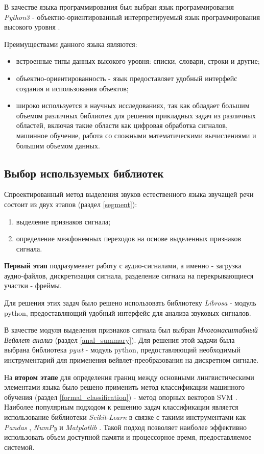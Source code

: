 \documentclass[utf8x, 14pt, oneside, a4paper]{article}
\begin{document}
	В качестве языка программирования был выбран язык программирования \textit{Python3} - объектно-ориентированный интерпретируемый язык программирования высокого уровня \cite{python}.
	
	Преимуществами данного языка являются:
	
	\begin{itemize}
		\item встроенные типы данных высокого уровня: списки, словари, строки и другие;
		\item объектно-ориентированность - язык предоставляет удобный интерфейс создания и использования объектов;
		\item широко используется в научных исследованиях, так как обладает большим объемом различных библиотек для решения прикладных задач из различных областей, включая такие области как цифровая обработка сигналов, машинное обучение, работа со сложными математическими вычислениями и большим объемом данных.
	\end{itemize}
	
	\subsection{Выбор используемых библиотек}
	
	Спроектированный метод выделения звуков естественного языка звучащей речи состоит из двух этапов (раздел \ref{segment}):
	\begin{enumerate}
		\item выделение признаков сигнала;
		\item определение межфонемных переходов на основе выделенных признаков сигнала.
	\end{enumerate}
	
	{\bf Первый этап} подразумевает работу с аудио-сигналами, а именно - загрузка аудио-файлов, дискретизация сигнала, разделение сигнала на перекрывающиеся участки - фреймы.
	
	Для решения этих задач было решено использовать библиотеку \textit{Librosa} \cite{librosa} - модуль python, предоставляющий удобный интерфейс для анализа звуковых сигналов.
	
	В качестве модуля выделения признаков сигнала был выбран \textit{Многомасштабный Вейвлет-анализ} (раздел \ref{anal_summary}). Для решения этой задачи была выбрана библиотека \textit{pywt} \cite{pywt} - модуль python, предоставляющий необходимый инструментарий для применения вейвлет-преобразования на дискретном сигнале.
	
	На {\bf втором этапе} для определения границ между основными лингвистическими элементами языка было решено применить метод классификации машинного обучения (раздел \ref{formal_classification}) - метод опорных векторов SVM \cite{svm}. Наиболее популярным подходом к решению задач классификации является использование библиотеки \textit{Scikit-Learn} \cite{scikit-learn} в связке с такими инструментами как \textit{Pandas} \cite{pandas}, \textit{NumPy} \cite{numpy} и \textit{Matplotlib} \cite{matplotlib}. Такой подход позволяет наиболее эффективно использовать объем доступной памяти и процессорное время, предоставляемое системой.
	
\end{document}
